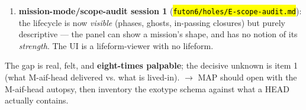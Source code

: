 \documentclass[11pt,oneside]{article}
\newcommand{\scopehl}[1]{\texttt{\hl{#1}}}
\begin{document}
\begin{phasebox}[title={1. IDENTIFY}]
\begin{subbox}[title={Where the gap is already palpable in the stack (evidence pass, 2026-06-10)}]
\begin{enumerate}[leftmargin=1.4em,itemsep=1pt]
\item \textbf{mission-mode/scope-audit session 1} (\scopehl{futon6/holes/E-scope-audit.md}): the lifecycle is now \emph{visible} (phases, ghosts, in-passing closures) but purely descriptive --- the panel can show a mission's shape, and has no notion of its \emph{strength}. The UI is a lifeform-viewer with no lifeform.
\end{enumerate}

\end{subbox}
\begin{subbox}[title={IDENTIFY exit}]

The gap is real, felt, and \textbf{eight-times palpable}; the decisive unknown is
item 1 (what M-aif-head delivered vs. what is lived-in). $\rightarrow$ MAP should open
with the M-aif-head autopsy, then inventory the exotype schema against what a
HEAD actually contains.

\end{subbox}
\end{phasebox}
\end{document}
